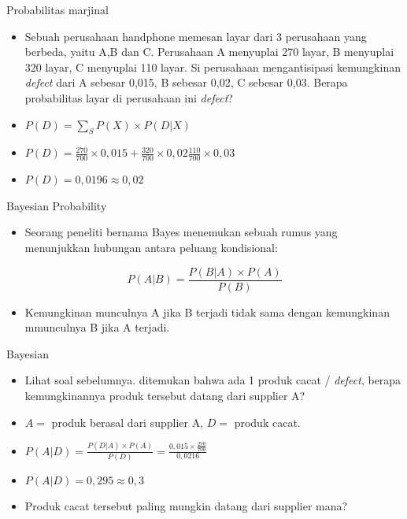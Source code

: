 \documentclass[
  ignorenonframetext,
]{beamer}
\providecommand{\tightlist}{%
  \setlength{\itemsep}{0pt}\setlength{\parskip}{0pt}}\usepackage{longtable,booktabs,array}
\begin{document}
\begin{frame}{Probabilitas marjinal}
\label{probabilitas-marjinal}
\begin{itemize}
\item
  Sebuah perusahaan handphone memesan layar dari 3 perusahaan yang
  berbeda, yaitu A,B dan C. Perusahaan A menyuplai 270 layar, B
  menyuplai 320 layar, C menyuplai 110 layar. Si perusahaan
  mengantisipasi kemungkinan \emph{defect} dari A sebesar 0,015, B
  sebesar 0,02, C sebesar 0,03. Berapa probabilitas layar di perusahaan
  ini \emph{defect}?
\item
  \(P(D)=\sum_S P(X) \times P(D|X)\)
\item
  \(P(D)=\frac{270}{700} \times 0,015 + \frac{320}{700} \times 0,02 \frac{110}{700} \times 0,03\)
\item
  \(P(D)=0,0196 \approx 0,02\)
\end{itemize}
\end{frame}

\begin{frame}{Bayesian Probability}
\label{bayesian-probability}
\begin{itemize}
\tightlist
\item
  Seorang peneliti bernama Bayes menemukan sebuah rumus yang menunjukkan
  hubungan antara peluang kondisional:
\end{itemize}

\[
P(A|B)=\frac{P(B|A) \times P(A)}{P(B)}
\]

\begin{itemize}
\tightlist
\item
  Kemungkinan munculnya A jika B terjadi tidak sama dengan kemungkinan
  mmunculnya B jika A terjadi.
\end{itemize}
\end{frame}

\begin{frame}{Bayesian}
\label{bayesian}
\begin{itemize}[<+->]
\item
  Lihat soal sebelumnya. ditemukan bahwa ada 1 produk cacat /
  \emph{defect}, berapa kemungkinannya produk tersebut datang dari
  supplier A?
\item
  \(A=\) produk berasal dari supplier A, \(D=\) produk cacat.
\item
  \(P(A|D)=\frac{P(D|A) \times P(A)}{P(D)}=\frac{0,015 \times \frac{270}{700}}{0,0216}\)
\item
  \(P(A|D)=0,295 \approx 0,3\)
\item
  Produk cacat tersebut paling mungkin datang dari supplier mana?
\end{itemize}
\end{frame}
\end{document}
